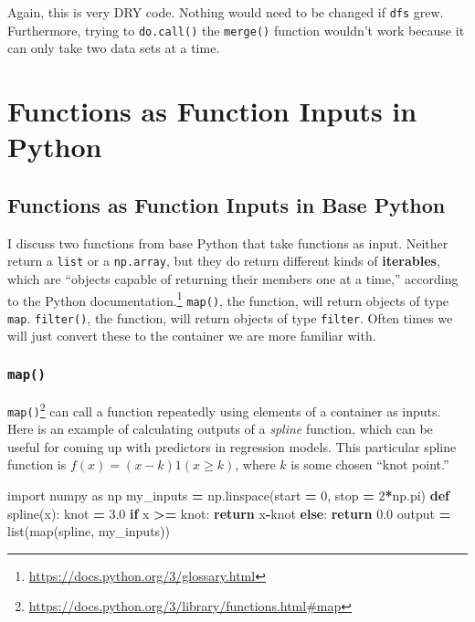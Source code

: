 \documentclass[12pt,krantz2]{krantz}
\makeatletter
\newenvironment{Shaded}{\begin{snugshade}}{\end{snugshade}}
\newcommand{\BuiltInTok}[1]{#1}
\newcommand{\ControlFlowTok}[1]{\textcolor[rgb]{0.27,0.27,0.27}{\textbf{#1}}}
\newcommand{\DecValTok}[1]{\textcolor[rgb]{0.06,0.06,0.06}{#1}}
\newcommand{\FloatTok}[1]{\textcolor[rgb]{0.06,0.06,0.06}{#1}}
\newcommand{\ImportTok}[1]{#1}
\newcommand{\KeywordTok}[1]{\textcolor[rgb]{0.27,0.27,0.27}{\textbf{#1}}}
\newcommand{\NormalTok}[1]{#1}
\newcommand{\OperatorTok}[1]{\textcolor[rgb]{0.43,0.43,0.43}{\textbf{#1}}}
\renewcommand{\href}[2]{#2\footnote{\url{#1}}}
\newenvironment{kframe}{%
\medskip{}
\setlength{\fboxsep}{.8em}
 \def\at@end@of@kframe{}%
 \ifinner\ifhmode%
  \def\at@end@of@kframe{\end{minipage}}%
  \begin{minipage}{\columnwidth}%
 \fi\fi%
 \def\FrameCommand##1{\hskip\@totalleftmargin \hskip-\fboxsep
 \colorbox{shadecolor}{##1}\hskip-\fboxsep
     \hskip-\linewidth \hskip-\@totalleftmargin \hskip\columnwidth}%
 \MakeFramed {\advance\hsize-\width
   \@totalleftmargin\z@ \linewidth\hsize
   \@setminipage}}%
 {\par\unskip\endMakeFramed%
 \at@end@of@kframe}
\renewenvironment{Shaded}{\begin{kframe}}{\end{kframe}}
\makeatother
\begin{document}
Again, this is very DRY code. Nothing would need to be changed if \texttt{dfs} grew. Furthermore, trying to \texttt{do.call()} the \texttt{merge()} function wouldn't work because it can only take two data sets at a time.

\hypertarget{functions-as-function-inputs-in-python}{%
\section{Functions as Function Inputs in Python}\label{functions-as-function-inputs-in-python}}

\hypertarget{functions-as-function-inputs-in-base-python}{%
\subsection{Functions as Function Inputs in Base Python}\label{functions-as-function-inputs-in-base-python}}

I discuss two functions from base Python that take functions as input. Neither return a \texttt{list} or a \texttt{np.array}, but they do return different kinds of \textbf{iterables}, which are ``objects capable of returning their members one at a time,'' \href{https://docs.python.org/3/glossary.html}{according to the Python documentation.} \texttt{map()}, the function, will return objects of type \texttt{map}. \texttt{filter()}, the function, will return objects of type \texttt{filter}. Often times we will just convert these to the container we are more familiar with.

\hypertarget{map}{%
\subsubsection{\texorpdfstring{\texttt{map()}}{map()}}\label{map}}

\href{https://docs.python.org/3/library/functions.html\#map}{\texttt{map()}} can call a function repeatedly using elements of a container as inputs. Here is an example of calculating outputs of a \emph{spline} function, which can be useful for coming up with predictors in regression models. This particular spline function is \(f(x) = (x-k)1(x \ge k)\), where \(k\) is some chosen ``knot point.''

\begin{Shaded}
\begin{Highlighting}[]
\ImportTok{import}\NormalTok{ numpy }\ImportTok{as}\NormalTok{ np}
\NormalTok{my_inputs }\OperatorTok{=}\NormalTok{ np.linspace(start }\OperatorTok{=} \DecValTok{0}\NormalTok{, stop }\OperatorTok{=} \DecValTok{2}\OperatorTok{*}\NormalTok{np.pi)}
\KeywordTok{def}\NormalTok{ spline(x):}
\NormalTok{    knot }\OperatorTok{=} \FloatTok{3.0}
    \ControlFlowTok{if}\NormalTok{ x }\OperatorTok{>=}\NormalTok{ knot:}
        \ControlFlowTok{return}\NormalTok{ x}\OperatorTok{-}\NormalTok{knot}
    \ControlFlowTok{else}\NormalTok{:}
        \ControlFlowTok{return} \FloatTok{0.0}
\NormalTok{output }\OperatorTok{=} \BuiltInTok{list}\NormalTok{(}\BuiltInTok{map}\NormalTok{(spline, my_inputs))}
\end{Highlighting}
\end{Shaded}
\end{document}
